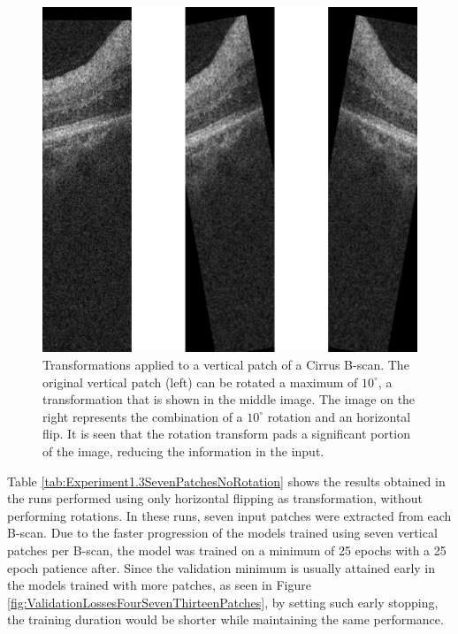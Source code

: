 \begin{figure}[!ht]
	\centering
	\includegraphics[width=0.5\linewidth]{figures/TransformationsInVerticalPatches.png}
	\caption{Transformations applied to a vertical patch of a Cirrus B-scan. The original vertical patch (left) can be rotated a maximum of $10^{\circ}$, a transformation that is shown in the middle image. The image on the right represents the combination of a $10^{\circ}$ rotation and an horizontal flip. It is seen that the rotation transform pads a significant portion of the image, reducing the information in the input.}
	\label{fig:TransformationsInVerticalPatches}
\end{figure}

Table \ref{tab:Experiment1.3SevenPatchesNoRotation} shows the results obtained in the runs performed using only horizontal flipping as transformation, without performing rotations. In these runs, seven input patches were extracted from each B-scan. Due to the faster progression of the models trained using seven vertical patches per B-scan, the model was trained on a minimum of 25 epochs with a 25 epoch patience after. Since the validation minimum is usually attained early in the models trained with more patches, as seen in Figure \ref{fig:ValidationLossesFourSevenThirteenPatches}, by setting such early stopping, the training duration would be shorter while maintaining the same performance.

